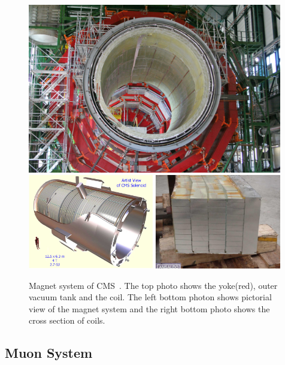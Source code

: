 %
\begin{figure}[h] 
\vspace{1cm}
\includegraphics[width=0.99\textwidth]{figures/Figure_CP-1.jpg} \\
\includegraphics[width=0.49\textwidth]{figures/CMS-solenoid-magnet.jpg} 
\includegraphics[width=0.49\textwidth]{figures/magnet-2000-049.jpg}
\caption{Magnet system of CMS~\cite{cmstdr1}. The top photo shows 
the yoke(red), outer vacuum tank and the coil. The left bottom photon shows 
pictorial view of the magnet system and the right bottom photo shows 
the cross section of coils.}
\label{fig:magnet} 
\end{figure} 



\subsection{Muon System} 

